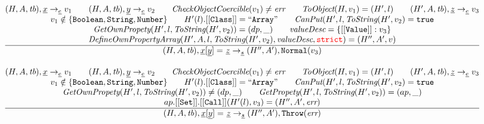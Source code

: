 \documentclass[a4paper, leqno]{amsart}
\newcommand{\rulesep}{\quad\quad}
\newcommand{\stmt}{s}
\newcommand{\expr}{e}
\newcommand{\ir}[1]{\ensuremath{\underline{#1}}}
\newcommand{\irid}{\ir{x}}
\def\inred{\color{red}}
\newcommand{\strict}{{\inred\tt strict}}
\newcommand{\true}{{\tt true}}
\newcommand{\tb}{\emph{tb}}
\newcommand{\err}{\emph{err}}
\newcommand{\hf}[1]{\emph{#1}}
\newcommand{\state}{\ensuremath{(H,A,\tb)}}
\newcommand{\evale}{\ensuremath{(H,A,\tb)}}
\def\inred{\color{red}}
\begin{document}
\[\begin{array}{l@{~~}l@{~~}ll}
\frac{\begin{matrix}
\evale, \irid \rightarrow_{\ir\expr} v_1
\rulesep
\evale, \ir{y} \rightarrow_{\ir\expr} v_2
\rulesep
\hf{CheckObjectCoercible}(v_1) \not= \err
\rulesep
\hf{ToObject}(H, v_1) = (H',l)
\rulesep
(H', A, \tb), \ir{z} \rightarrow_{\ir\expr} v_3
\\
v_1 \notin \{{\tt Boolean, String, Number}\}
\rulesep
H'(l).[[{\tt Class}]] = {\tt``Array"}%
\rulesep
\hf{CanPut}(H', l, \hf{ToString}(H', v_2) = \true
\\
\hf{GetOwnPropety}(H', l, \hf{ToString}(H', v_2)) = (dp, \_)
\rulesep
\hf{valueDesc} = \{[[{\tt Value}]]:v_3\}
\\
\hf{DefineOwnPropertyArray}(H', A, l, \hf{ToString}(H', v_2), \hf{valueDesc}, \strict) = (H'', A', v)
\end{matrix}}{\begin{matrix}
\state, \irid{\tt[}\ir{y}{\tt] =} \ \ir{z} \rightarrow_{\ir\stmt}
(H'',A'), {\tt Normal}(v_3)
\end{matrix}}
\\[2em]




\frac{\begin{matrix}
\evale, \irid \rightarrow_{\ir\expr} v_1
\rulesep
\evale, \ir{y} \rightarrow_{\ir\expr} v_2
\rulesep
\hf{CheckObjectCoercible}(v_1) \not= \err
\rulesep
\hf{ToObject}(H, v_1) = (H',l)
\rulesep
(H', A, \tb), \ir{z} \rightarrow_{\ir\expr} v_3
\\
v_1 \notin \{{\tt Boolean, String, Number}\}
\rulesep
H'(l).[[{\tt Class}]] = {\tt``Array"}%
\rulesep
\hf{CanPut}(H', l, \hf{ToString}(H', v_2) = \true
\\
\hf{GetOwnPropety}(H', l,\hf{ToString}(H', v_2)) \not= (dp, \_)
\rulesep
\hf{GetPropety}(H', l,\hf{ToString}(H', v_2)) = (ap, \_)
\\
ap.{\tt[[Set]]}.{\tt[[Call]]}(H'(l), v_3) = (H'', A', \err)
\end{matrix}}{\begin{matrix}
\state, \irid{\tt[}\ir{y}{\tt] =} \ \ir{z} \rightarrow_{\ir\stmt}
(H'',A'), {\tt Throw}(\err)
\end{matrix}}
\\[2em]



\end{array}\]
\end{document}
